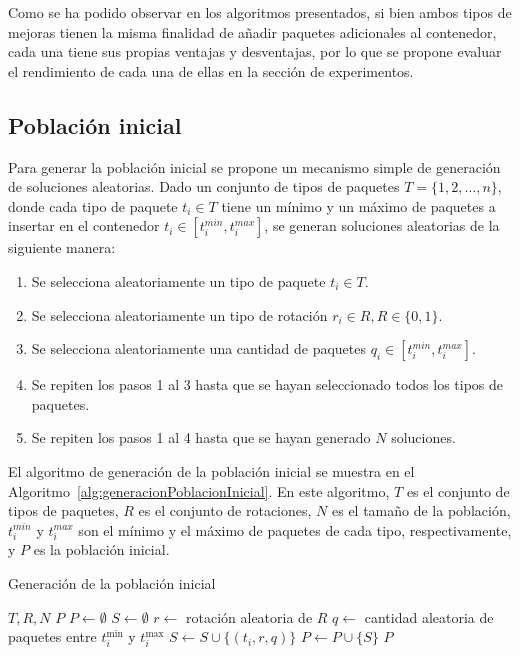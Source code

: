 \documentclass[openany]{article}
\begin{document}
Como se ha podido observar en los algoritmos presentados, si bien ambos tipos de mejoras tienen la misma finalidad de añadir paquetes adicionales al contenedor, cada una tiene sus propias ventajas y desventajas, por lo que se propone evaluar el rendimiento de cada una de ellas en la sección de experimentos.


\subsection{Población inicial}

Para generar la población inicial se propone un mecanismo simple de generación de soluciones aleatorias. Dado un conjunto de tipos de paquetes $T = \{1,2, \ldots, n\}$, donde cada tipo de paquete $t_i \in T$ tiene un mínimo y un máximo de paquetes a insertar en el contenedor $t_i \in [t_i^{min},t_i^{max}]$, se generan soluciones aleatorias de la siguiente manera:

\begin{enumerate}
    \item Se selecciona aleatoriamente un tipo de paquete $t_i \in T$.
    \item Se selecciona aleatoriamente un tipo de rotación $r_i \in R, R \in \{0,1\}$.
    \item Se selecciona aleatoriamente una cantidad de paquetes $q_i \in [t_i^{min},t_i^{max}]$.
    \item Se repiten los pasos 1 al 3 hasta que se hayan seleccionado todos los tipos de paquetes.
    \item Se repiten los pasos 1 al 4 hasta que se hayan generado $N$ soluciones.
\end{enumerate}

El algoritmo de generación de la población inicial se muestra en el Algoritmo~\ref{alg:generacionPoblacionInicial}. En este algoritmo, $T$ es el conjunto de tipos de paquetes, $R$ es el conjunto de rotaciones, $N$ es el tamaño de la población, $t_i^{min}$ y $t_i^{max}$ son el mínimo y el máximo de paquetes de cada tipo, respectivamente, y $P$ es la población inicial.

\begin{algorithm}[H]
    \caption{Generación de la población inicial}\label{alg:generacionPoblacionInicial}
    \begin{algorithmic}[1]
        \Require $T, R, N$
        \Ensure $P$
        \State $P \leftarrow \emptyset$
        \State $S \leftarrow \emptyset$
        \State $r \leftarrow$ rotación aleatoria de $R$
        \State $q \leftarrow$ cantidad aleatoria de paquetes entre $t_i^{\min}$ y $t_i^{\max}$
        \State $S \leftarrow S \cup \{(t_i, r, q)\}$
        \EndFor
        \State $P \leftarrow P \cup \{S\}$
        \EndFor
        \State \Return $P$
    \end{algorithmic}
\end{algorithm}
\end{document}
